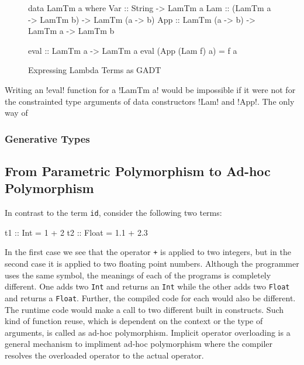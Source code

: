 \documentclass[manuscript,screen,nonacm]{acmart}
\begin{document}
\begin{figure}[ht]
  \centering
  \begin{minipage}[ht]{0.5\linewidth}
    \begin{code}
data LamTm a where
  Var :: String -> LamTm a
  Lam :: (LamTm a -> LamTm b) -> LamTm (a -> b)
  App :: LamTm (a -> b) -> LamTm a -> LamTm b
    \end{code}
  \end{minipage}%
  \begin{minipage}[ht]{0.5\linewidth}
    \begin{code}
      eval :: LamTm a -> LamTm a
      eval (App (Lam f) a) = f a

      
    \end{code}
  \end{minipage}
  \caption{Expressing Lambda Terms as GADT}
  \label{fig:gadt-example}
\end{figure}
Writing an !eval! function for a !LamTm a! would be impossible if it were not for the constrainted type arguments of data constructors !Lam! and !App!. The only way of 

\subsubsection{Generative Types}
\subsection{From Parametric Polymorphism to Ad-hoc Polymorphism}
In contrast to the term \lstinline{id}, consider the following two terms:
\begin{code}
    t1 :: Int = 1 + 2
    t2 :: Float = 1.1 + 2.3
\end{code}

In the first case we see that the operator \lstinline{+} is applied to two integers, but in the second case it is applied to two floating point numbers. Although the programmer uses the same symbol, the meanings of each of the programs is completely different. One adds two \lstinline{Int} and returns an \lstinline{Int} while the other adds two \lstinline{Float} and returns a \lstinline{Float}. Further, the compiled code for each would also be different. The runtime code would make a call to two different built in constructs. Such kind of function reuse, which is dependent on the context or the type of arguments, is called as ad-hoc polymorphism\cite{strachey_fundamental_2000}. Implicit operator overloading is a general mechanism to impliment ad-hoc polymorphism where the compiler resolves the overloaded operator to the actual operator.
\end{document}

